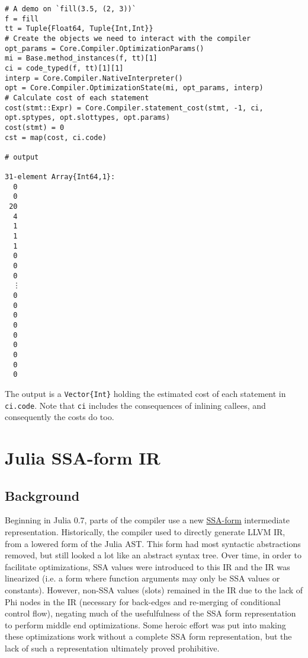 \begin{verbatim}
# A demo on `fill(3.5, (2, 3))`
f = fill
tt = Tuple{Float64, Tuple{Int,Int}}
# Create the objects we need to interact with the compiler
opt_params = Core.Compiler.OptimizationParams()
mi = Base.method_instances(f, tt)[1]
ci = code_typed(f, tt)[1][1]
interp = Core.Compiler.NativeInterpreter()
opt = Core.Compiler.OptimizationState(mi, opt_params, interp)
# Calculate cost of each statement
cost(stmt::Expr) = Core.Compiler.statement_cost(stmt, -1, ci, opt.sptypes, opt.slottypes, opt.params)
cost(stmt) = 0
cst = map(cost, ci.code)

# output

31-element Array{Int64,1}:
  0
  0
 20
  4
  1
  1
  1
  0
  0
  0
  ⋮
  0
  0
  0
  0
  0
  0
  0
  0
  0
\end{verbatim}



The output is a \texttt{Vector\{Int\}} holding the estimated cost of each statement in \texttt{ci.code}.  Note that \texttt{ci} includes the consequences of inlining callees, and consequently the costs do too.



\hypertarget{16468279497102584880}{}


\section{Julia SSA-form IR}



\hypertarget{5370755282098388224}{}


\subsection{Background}



Beginning in Julia 0.7, parts of the compiler use a new \href{https://en.wikipedia.org/wiki/Static\_single\_assignment\_form}{SSA-form} intermediate representation. Historically, the compiler used to directly generate LLVM IR, from a lowered form of the Julia AST. This form had most syntactic abstractions removed, but still looked a lot like an abstract syntax tree. Over time, in order to facilitate optimizations, SSA values were introduced to this IR and the IR was linearized (i.e. a form where function arguments may only be SSA values or constants). However, non-SSA values (slots) remained in the IR due to the lack of Phi nodes in the IR (necessary for back-edges and re-merging of conditional control flow), negating much of the usefulfulness of the SSA form representation to perform middle end optimizations. Some heroic effort was put into making these optimizations work without a complete SSA form representation, but the lack of such a representation ultimately proved prohibitive.



